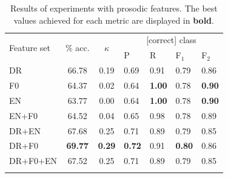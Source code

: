 \documentclass[a4paper]{article}
\begin{document}
	

		\begin{table}
			\centering
			\caption[Results of experiments with prosodic features]{Results of experiments with prosodic features.%
			The best values achieved for each metric are displayed in \textbf{bold}.
			}
			\begin{tabularx}{\columnwidth}{lccXXXX}			
			
			\toprule
			\multirow{2}{*}{Feature set} & \multirow{2}{*}{\% acc.} & \multirow{2}{*}{$\kappa$} & \multicolumn{4}{c}{[correct] class} \\
			 \cmidrule(lr){4-7}
			& & & P & R & F$_1$ & F$_2$ \\
			\midrule
		
DR	&	66.78	&	0.19	&	0.69	&	0.91	&	0.79	&	0.86	\\
F0		&	64.37	&	0.02	&	0.64	&	\textbf{1.00}	&	0.78	&	\textbf{0.90}	\\
EN		&	63.77	&	0.00	&	0.64	&	\textbf{1.00}	&	0.78	&	\textbf{0.90}	\\
\addlinespace											
EN+F0		&	64.52	&	0.04	&	0.65	&	0.98	&	0.78	&	0.89	\\
DR+EN	&	67.68	&	0.25	&	0.71	&	0.89	&	0.79	&	0.85	\\
DR+F0		&	\textbf{69.77}	&	\textbf{0.29}	&	\textbf{0.72}	&	0.91	&	\textbf{0.80}	&	0.86	\\
\addlinespace											
DR+F0+EN &	67.52	&	0.25	&	0.71	&	0.89	&	0.79	&	0.85	\\		
			\bottomrule
			\label{tab:results:prosody}
			\end{tabularx}
		\end{table}	
		
\end{document}
